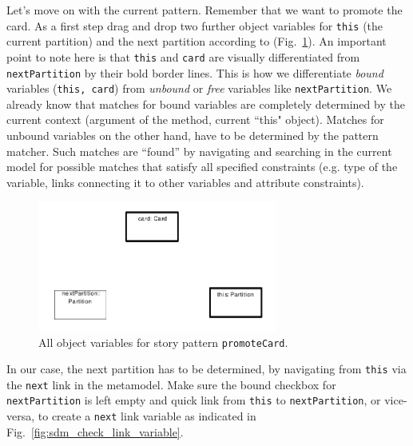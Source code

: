 Let's move on with the current pattern. Remember that we want to promote the
card.  As a first step drag and drop two further object variables for
\texttt{this} (the current partition) and the next partition according to
(Fig.~\ref{fig:sdm_check_complete_sp}).  An important point to note here is
that \texttt{this} and \texttt{card} are visually differentiated from
\texttt{nextPartition} by their bold border lines. This is how we differentiate
\emph{bound}  variables (\texttt{this, card}) from
\emph{unbound} or \emph{free} variables like \texttt{nextPartition}.  We already know that matches for bound variables are completely determined by the current
context (argument of the method, current ``this" object).  Matches for unbound
variables on the other hand, have to be determined by the pattern matcher.  Such
matches are ``found'' by navigating and searching in the current model for
possible matches that satisfy all specified constraints (e.g. type of the
variable, links connecting it to other variables and attribute constraints). 

\begin{figure}[htbp]
\begin{center}
  \includegraphics[width=0.7\textwidth]{pics/sdmBilder/check/sdm25.pdf}
  \caption{All object variables for story pattern \texttt{promoteCard}.}  
  \label{fig:sdm_check_complete_sp}
\end{center}
\end{figure} 

In our case, the next partition has to be determined, by navigating from
\texttt{this} via the \texttt{next} link in the metamodel.  Make sure the bound
checkbox for \texttt{nextPartition} is left empty and quick link from
\texttt{this} to \texttt{nextPartition}, or vice-versa, to create a
\texttt{next} link variable as indicated in
Fig.~\ref{fig:sdm_check_link_variable}. 

